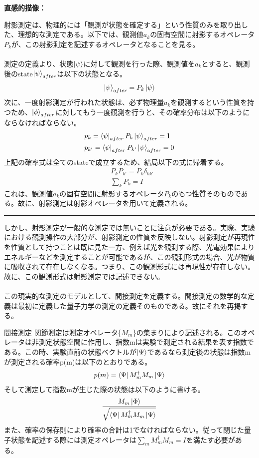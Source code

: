 \documentclass[a4paper,10.5pt]{article}
\numberwithin{equation}{section}
\newenvironment{intuitionbox}
{\begin{prooflabel}\textbf{直感的描像：}\end{prooflabel}\vspace{0.8em}}
{\par\vspace{1em}\hrule\vspace{1em}}
\begin{document}
\begin{intuitionbox}
射影測定は、物理的には「観測が状態を確定する」という性質のみを取り出した、理想的な測定である。以下では、観測値$a_{k}$の固有空間に射影するオペレータ$P_{k}$が、この射影測定を記述するオペレータとなることを見る。\\
\\
測定の定義より、状態$\ket{\psi}$に対して観測を行った際、観測値を$a_{k}$とすると、観測後のstate$\ket{\psi}_{after}$は以下の状態となる。
\begin{align*}
\ket{\psi}_{after}=P_{k}\ket{\psi}
\end{align*}
次に、一度射影測定が行われた状態は、必ず物理量$a_{k}$を観測するという性質を持つため、$\ket{\phi}_{after}$に対してもう一度観測を行うと、その確率分布は以下のようにならなければならない。
\begin{align*}
&p_{k}=\bra{\psi}_{after}P_{k}\ket{\psi}_{after}=1\\
&p_{k'}=\bra{\psi}_{after}P_{k'}\ket{\psi}_{after}=0
\end{align*}
上記の確率式は全てのstateで成立するため、結局以下の式に帰着する。
\begin{align*}
&P_{k}P_{k'}=P_{k}\delta_{kk'}\\
&\sum_{k}P_{k}=I
\end{align*}
これは、観測値$a_{k}$の固有空間に射影するオペレータ$P_{k}$のもつ性質そのものである。故に、射影測定は射影オペレータを用いて定義される。
\end{intuitionbox}
しかし、射影測定が一般的な測定では無いことに注意が必要である。実際、実験における観測操作の大部分が、射影測定の性質を反映しない。射影測定が再現性を性質として持つことは既に見た一方、例えば光を観測する際、光電効果によりエネルギーなどを測定することが可能であるが、この観測形式の場合、光が物質に吸収されて存在しなくなる。つまり、この観測形式には再現性が存在しない。故に、この観測形式は射影測定では記述できない。\\
\\
この現実的な測定のモデルとして、間接測定を定義する。間接測定の数学的な定義は最初に定義した量子力学の測定の定義そのものである。故にそれを再掲する。
\begin{defbox}{間接測定}
関節測定は測定オペレータ\{$M_{m}$\}の集まりにより記述される。このオペレータは非測定状態空間に作用し、指数mは実験で測定される結果を表す指数である。この時、実験直前の状態ベクトルが$\ket{\Psi}$であるなら測定後の状態は指数mが測定される確率p(m)は以下のとおりである。\\
 \begin{equation}\begin{split}
     p(m) = \bra{\Psi}M_{m}^{\dagger} M_{m}\ket{\Psi} 
 \end{split} \end{equation}
 そして測定して指数mが生じた際の状態は以下のように書ける。
 \begin{equation}\begin{split}
     \frac{M_{m}\ket{\Phi}}{\sqrt{\bra{\Psi}M_{m}^{\dagger} M_{m}\ket{\Psi}}}
 \end{split} \end{equation}
 また、確率の保存則により確率の合計は1でなければならない。従って閉じた量子状態を記述する際には測定オペレータは$\sum_{m}M_{m}^{\dagger} M_{m}=I$を満たす必要がある。
\end{defbox}
\end{document}
